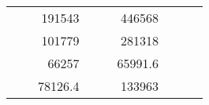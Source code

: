 \begin{table}[H]
\begin{tabular}{|ccrccrccc}
\multicolumn{1}{|c|}{\cellcolor[HTML]{FFFFC7}}                                & \multicolumn{1}{c|}{\cellcolor[HTML]{DDFDFF}}                      & \multicolumn{1}{r|}{\cellcolor[HTML]{DAE8FC}191543}    & \multicolumn{1}{c|}{\cellcolor[HTML]{FFFFC7}}                                & \multicolumn{1}{c|}{\cellcolor[HTML]{DDFDFF}}                       & \multicolumn{1}{r|}{\cellcolor[HTML]{DDFDFF}446568}    &                                                                              &                                                                    &                                                        \\ \cline{3-3} \cline{6-6}
\multicolumn{1}{|c|}{\cellcolor[HTML]{FFFFC7}}                                & \multicolumn{1}{c|}{\cellcolor[HTML]{DDFDFF}}                      & \multicolumn{1}{r|}{\cellcolor[HTML]{DDFDFF}101779}    & \multicolumn{1}{c|}{\cellcolor[HTML]{FFFFC7}}                                & \multicolumn{1}{c|}{\cellcolor[HTML]{DDFDFF}}                       & \multicolumn{1}{r|}{\cellcolor[HTML]{DAE8FC}281318}    &                                                                              &                                                                    &                                                        \\ \cline{3-3} \cline{6-6}
\multicolumn{1}{|c|}{\cellcolor[HTML]{FFFFC7}}                                & \multicolumn{1}{c|}{\cellcolor[HTML]{DDFDFF}}                      & \multicolumn{1}{r|}{\cellcolor[HTML]{DAE8FC}66257}     & \multicolumn{1}{c|}{\cellcolor[HTML]{FFFFC7}}                                & \multicolumn{1}{c|}{\cellcolor[HTML]{DDFDFF}}                       & \multicolumn{1}{r|}{\cellcolor[HTML]{DDFDFF}65991.6}   &                                                                              &                                                                    &                                                        \\ \cline{3-3} \cline{6-6}
\multicolumn{1}{|c|}{\cellcolor[HTML]{FFFFC7}}                                & \multicolumn{1}{c|}{\cellcolor[HTML]{DDFDFF}}                      & \multicolumn{1}{r|}{\cellcolor[HTML]{DDFDFF}78126.4}   & \multicolumn{1}{c|}{\cellcolor[HTML]{FFFFC7}}                                & \multicolumn{1}{c|}{\cellcolor[HTML]{DDFDFF}}                       & \multicolumn{1}{r|}{\cellcolor[HTML]{DAE8FC}133963}    &                                                                              &                                                                    &                                                        \\ \cline{3-3} \cline{6-6}

\end{tabular}
\end{table}
